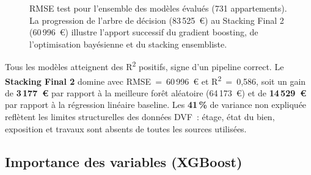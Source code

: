 \documentclass[12pt,a4paper]{article}
\begin{document}
\begin{figure}[htbp]
\centering
{}
\caption{RMSE test pour l'ensemble des mod\`eles \'evalu\'es (731 appartements). La progression de l'arbre de d\'ecision (83\,525~\euro) au Stacking Final 2 (60\,996~\euro) illustre l'apport successif du gradient boosting, de l'optimisation bay\'esienne et du stacking ensembliste.}
\label{fig:gap_compare}
\end{figure}

\begin{descrbox}
Tous les mod\`eles atteignent des R\textsuperscript{2} positifs, signe d'un pipeline correct. Le \textbf{Stacking Final 2} domine avec RMSE~=~60\,996~\euro{} et R\textsuperscript{2}~=~0{,}586, soit un gain de \textbf{3\,177~\euro} par rapport \`a la meilleure for\^et al\'eatoire (64\,173~\euro) et de \textbf{14\,529~\euro} par rapport \`a la r\'egression lin\'eaire baseline. Les \textbf{41\,\%} de variance non expliqu\'ee refl\`etent les limites structurelles des donn\'ees DVF~: \'etage, \'etat du bien, exposition et travaux sont absents de toutes les sources utilis\'ees.
\end{descrbox}

\subsection{Importance des variables (XGBoost)}
\end{document}
